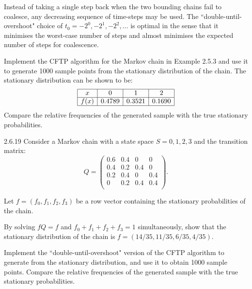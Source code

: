 Instead of taking a single step back when the two bounding chains fail to coalesce, any decreasing sequence of time-steps may be used. The \textquotedblleft double-until-overshoot" choice of $t_0=-2^0,-2^1,-2^2,\ldots$ is optimal in the sense that it minimises the worst-case number of steps and almost minimises the expected number of steps for coalescence.


\begin{exercise}
Implement the CFTP algorithm for the Markov chain in Example 2.5.3 and use it to generate 1000 sample points from the stationary distribution of the chain. The stationary distribution can be shown to be:
$$\begin{array}{|c|c|c|c|}\hline
x	&0&	1&	2\\ \hline
f(x)	&0.4789	&0.3521	&0.1690\\ \hline
\end{array}$$
Compare the relative frequencies of the generated sample with the true stationary probabilities.

\end{exercise}

\begin{exercise}
2.6.19	Consider a Markov chain with a state space $S = {0, 1, 2, 3}$ and the transition matrix:
$$Q=\left( \begin{array}{cccc}
0.6&0.4&0&0\\
0.4&0.2&0.4&0\\
0.2&0.4&0&0.4\\
0&0.2&0.4&0.4\\
\end{array}\right).$$

Let $f=(f_0,f_1,f_2,f_3)$ be a row vector containing the stationary probabilities of the chain.
\begin{asparaenum}[(a)]
\item By solving $fQ=f$ and $f_0+f_1+f_2+f_3=1$ simultaneously, show that the stationary distribution of the chain is $f=(14/35,11/35,6/35,4/35)$.

\item Implement the \textquotedblleft double-until-overshoot" version of the CFTP algorithm to generate from the stationary distribution, and use it to obtain 1000 sample points. Compare the relative frequencies of the generated sample with the true stationary probabilities.
\end{asparaenum}
\end{exercise}
